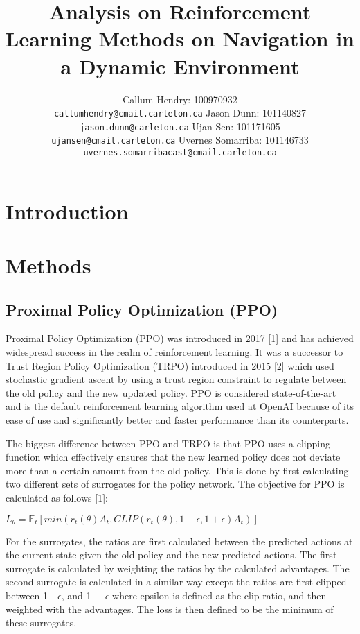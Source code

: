 \documentclass{article}
\title{Analysis on Reinforcement Learning Methods on Navigation in a Dynamic Environment}
\author{
    Callum Hendry: 100970932\\
    \texttt{callumhendry@cmail.carleton.ca}
    \And
    Jason Dunn: 101140827\\
    \texttt{jason.dunn@carleton.ca}
    \And
    Ujan Sen: 101171605\\
    \texttt{ujansen@cmail.carleton.ca}
    \And
    Uvernes Somarriba: 101146733\\
    \texttt{uvernes.somarribacast@cmail.carleton.ca}
}
\begin{document}
    
    
    \maketitle
    
    \section{Introduction}
    
    \section{Methods}
    \subsection{Proximal Policy Optimization (PPO)}
    \label{ppo}
    
    Proximal Policy Optimization (PPO) was introduced in 2017 [1] and has achieved widespread success in the realm of reinforcement learning. It was a successor to Trust Region Policy Optimization (TRPO) introduced in 2015 [2] which used stochastic gradient ascent by using a trust region constraint to regulate between the old policy and the new updated policy. PPO is considered state-of-the-art and is the default reinforcement learning algorithm used at OpenAI because of its ease of use and significantly better and faster performance than its counterparts. 
    
    The biggest difference between PPO and TRPO is that PPO uses a clipping function which effectively ensures that the new learned policy does not deviate more than a certain amount from the old policy. This is done by first calculating two different sets of surrogates for the policy network. The objective for PPO is calculated as follows [1]:
    
    \begin{center}
        $L_{\theta} = \mathbb{E}_{t}[min(r_{t}({\theta})A_{t}, CLIP(r_{t}({\theta}), 1-\epsilon, 1+\epsilon)A_{t})]$
    \end{center}
    
    For the surrogates, the ratios are first calculated between the predicted actions at the current state given the old policy and the new predicted actions. The first surrogate is calculated by weighting the ratios by the calculated advantages. The second surrogate is calculated in a similar way except the ratios are first clipped between 1 - $\epsilon$, and 1 + $\epsilon$ where epsilon is defined as the clip ratio, and then weighted with the advantages. The loss is then defined to be the minimum of these surrogates.
    
\end{document}

